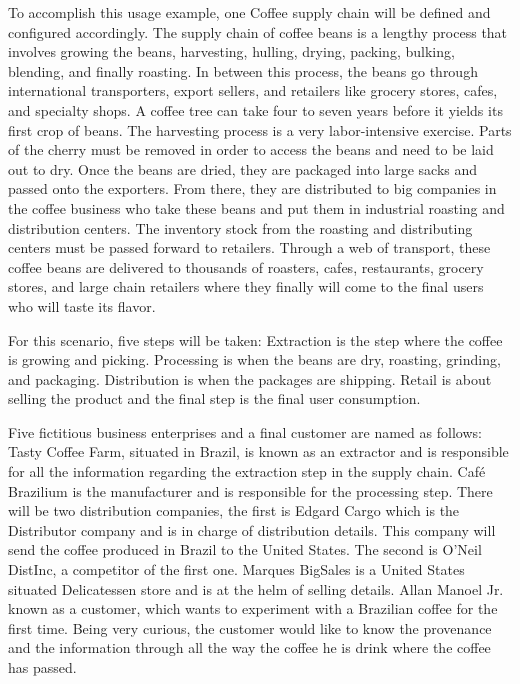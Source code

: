 To accomplish this usage example, one Coffee supply chain will be defined and configured accordingly. The supply chain of coffee beans is a lengthy process that involves growing the beans, harvesting, hulling, drying, packing, bulking, blending, and finally roasting. In between this process, the beans go through international transporters, export sellers, and retailers like grocery stores, cafes, and specialty shops. A coffee tree can take four to seven years before it yields its first crop of beans. The harvesting process is a very labor-intensive exercise. Parts of the cherry must be removed in order to access the beans and need to be laid out to dry. Once the beans are dried, they are packaged into large sacks and passed onto the exporters. From there, they are distributed to big companies in the coffee business who take these beans and put them in industrial roasting and distribution centers. The inventory stock from the roasting and distributing centers must be passed forward to retailers. Through a web of transport, these coffee beans are delivered to thousands of roasters, cafes, restaurants, grocery stores, and large chain retailers where they finally will come to the final users who will taste its flavor. 

For this scenario, five steps will be taken: Extraction is the step where the coffee is growing and picking. Processing is when the beans are dry, roasting, grinding, and packaging. Distribution is when the packages are shipping. Retail is about selling the product and the final step is the final user consumption.

Five fictitious business enterprises and a final customer are named as follows: Tasty Coffee Farm, situated in Brazil, is known as an extractor and is responsible for all the information regarding the extraction step in the supply chain. Café Brazilium is the manufacturer and is responsible for the processing step. There will be two distribution companies, the first is Edgard Cargo which is the Distributor company and is in charge of distribution details. This company will send the coffee produced in Brazil to the United States. The second is O'Neil DistInc, a competitor of the first one. Marques BigSales is a United States situated Delicatessen store and is at the helm of selling details. Allan Manoel Jr. known as a customer, which wants to experiment with a Brazilian coffee for the first time. Being very curious, the customer would like to know the provenance and the information through all the way the coffee he is drink where the coffee has passed.  

